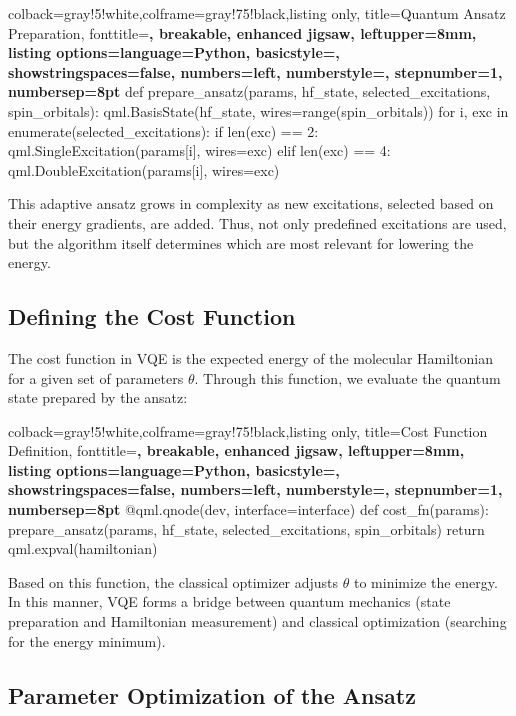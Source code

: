\begin{tcblisting}{colback=gray!5!white,colframe=gray!75!black,listing only,
    title=Quantum Ansatz Preparation, fonttitle=\bfseries, breakable, enhanced jigsaw, leftupper=8mm,
    listing options={language=Python, basicstyle=\ttfamily\small,
    showstringspaces=false, numbers=left, numberstyle=\footnotesize, stepnumber=1, numbersep=8pt}}
def prepare_ansatz(params, hf_state, selected_excitations, spin_orbitals):
    qml.BasisState(hf_state, wires=range(spin_orbitals))
    for i, exc in enumerate(selected_excitations):
        if len(exc) == 2:
            qml.SingleExcitation(params[i], wires=exc)
        elif len(exc) == 4:
            qml.DoubleExcitation(params[i], wires=exc)
\end{tcblisting}

This adaptive ansatz grows in complexity as new excitations, selected based on their energy gradients, are added. Thus, not only predefined excitations are used, but the algorithm itself determines which are most relevant for lowering the energy.

\subsection{Defining the Cost Function}

The cost function in VQE is the expected energy of the molecular Hamiltonian for a given set of parameters \(\theta\). Through this function, we evaluate the quantum state prepared by the ansatz:

\begin{tcblisting}{colback=gray!5!white,colframe=gray!75!black,listing only,
    title=Cost Function Definition, fonttitle=\bfseries, breakable, enhanced jigsaw, leftupper=8mm,
    listing options={language=Python, basicstyle=\ttfamily\small,
    showstringspaces=false, numbers=left, numberstyle=\footnotesize, stepnumber=1, numbersep=8pt}}
@qml.qnode(dev, interface=interface)
def cost_fn(params):
    prepare_ansatz(params, hf_state, selected_excitations, spin_orbitals)
    return qml.expval(hamiltonian)
\end{tcblisting}

Based on this function, the classical optimizer adjusts \(\theta\) to minimize the energy. In this manner, VQE forms a bridge between quantum mechanics (state preparation and Hamiltonian measurement) and classical optimization (searching for the energy minimum).

\subsection{Parameter Optimization of the Ansatz}

